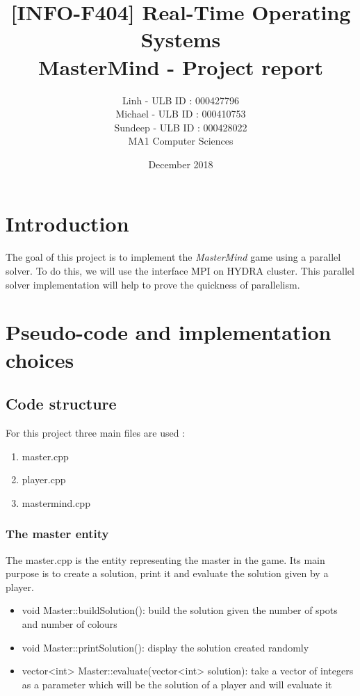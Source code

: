 \documentclass{article}
\title{[INFO-F404] Real-Time Operating Systems \\ MasterMind - Project report}
\author{\bsc{BUI QUANG PHUONG} Linh - ULB ID : 000427796 \\ \bsc{PAQUET} Michael - ULB ID : 000410753 \\ \bsc{SINGH} Sundeep - ULB ID : 000428022 \\ MA1 Computer Sciences}
\date{December 2018}
\begin{document}
\maketitle

\section*{Introduction}
The goal of this project is to implement the \textit{MasterMind} game using a parallel solver. To do this, we will use the interface MPI on HYDRA cluster. This parallel solver implementation will help to prove the quickness of parallelism.  

\section{Pseudo-code and implementation choices}

\subsection{Code structure}
For this project three main files are used :
\begin{enumerate}
   \item {\selectfont master.cpp}
    \item {\selectfont player.cpp}
    \item {\selectfont mastermind.cpp}
\end{enumerate}

\subsubsection{The master entity}
The {\selectfont master.cpp} is the entity representing the master in the game. Its main purpose is to create a solution, print it and evaluate the solution given by a player.

\begin{itemize}
    \item {\selectfont void Master::buildSolution()}: build the solution given the number of spots and number of colours
    \item {\selectfont void Master::printSolution()}: display the solution created randomly
    \item {\selectfont vector<int> Master::evaluate(vector<int> solution)}: take a vector of integers as a parameter which will be the solution of a player and will evaluate it
\end{itemize}
\end{document}
